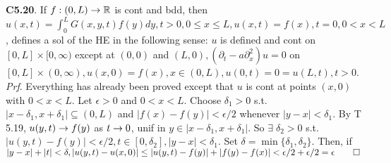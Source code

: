 {\bf C5.20}. If $f: (0,L) \rightarrow \mathbb{R}$ is cont and bdd, then $u(x,t)= \int_0^L G(x,y,t)f(y) dy, t>0, 0 \leq x \leq L, u(x,t)=f(x), t=0, 0<x<L$, defines a sol of the HE in the following sense:  $u$ is defined and cont on $[0,L] \times [0, \infty)$ except at $(0,0)$ and $(L,0), (\partial_t - a\partial_x^2)u = 0$ on $[0,L] \times (0,\infty), u(x,0)=f(x), x \in (0,L), u(0,t)=0=u(L,t), t >0$. {\it Prf}. Everything has already been proved except that $u$ is cont at points $(x,0)$ with $0 < x<L$. Let $\epsilon > 0$ and $0<x<L$. Choose $\delta_1>0$ s.t. $|x - \delta_1, x + \delta_1| \subseteq (0,L)$ and $|f(x)-f(y)|<\epsilon/2$ whenever $|y-x|< \delta_1$. By T 5.19, $u(y,t) \rightarrow f(y)$ as $t\rightarrow 0$, unif in $y \in |x - \delta_1, x + \delta_1|$. So $\exists \;\delta_2 >0$ s.t. $|u(y,t)-f(y)| < \epsilon/2, t \in [0, \delta_2], |y-x| < \delta_1$. Set $\delta = \min \{\delta_1, \delta_2\}$. Then, if $|y-x| + |t| < \delta, |u(y,t)-u(x,0)| \leq |u(y,t)- f(y)|+|f(y)-f(x)|< \epsilon/2+\epsilon/2=\epsilon \qed$